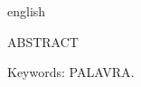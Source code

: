\begin{resumo}[Abstract]
 \begin{otherlanguage*}{english}
 

\noindent ABSTRACT

\noindent Keywords: PALAVRA.

\end{otherlanguage*}
\end{resumo}